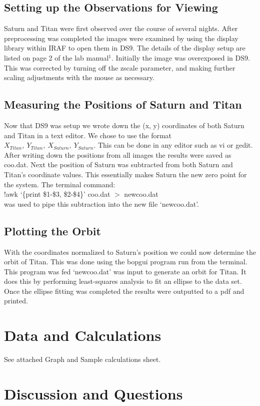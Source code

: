 \documentclass{article}
\begin{document}
\subsection{Setting up the Observations for Viewing}
Saturn and Titan were first observed over the course of several nights. After preprocessing was completed the images were examined by using the display library within IRAF to open them in DS9. The details of the display setup are listed on page 2 of the lab manual$^1$. Initially the image was overexposed in DS9. This was corrected by turning off the zscale parameter, and making further scaling adjustments with the mouse as necessary.
\subsection{Measuring the Positions of Saturn and Titan}
Now that DS9 was setup we wrote down the (x, y) coordinates of both Saturn and Titan in a text editor. We chose to use the format $X_{Titan},\ Y_{Titan},\ X_{Saturn},\ Y_{Saturn}$. This can be done in any editor such as vi or gedit. After writing down the positions from all images the results were saved as coo.dat. Next the position of Saturn was subtracted from both Saturn and Titan's coordinate values. This essentially makes Saturn the new zero point for the system. The terminal command:\\ 

!awk `\{print \$1-\$3, \$2-\$4\}' coo.dat $>$ newcoo.dat \\

was used to pipe this subtraction into the new file `newcoo.dat'.

\subsection{Plotting the Orbit}
With the coordinates normalized to Saturn’s position we could now determine the orbit of Titan. This was done using the bopgui program run from the terminal. This program was fed `newcoo.dat' was input to generate an orbit for Titan. It does this by performing least-squares analysis to fit an ellipse to the data set. Once the ellipse fitting was completed the results were outputted to a pdf and printed.
\section{Data and Calculations}
See attached Graph and Sample calculations sheet.
\section{Discussion and Questions}
\end{document}
